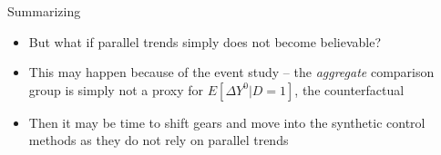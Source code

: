 \documentclass{beamer}
\begin{document}
\begin{frame}{Summarizing}

\begin{itemize}

\item But what if parallel trends simply does not become believable?
\item This may happen because of the event study -- the \emph{aggregate} comparison group is simply not a proxy for $E[\Delta Y^0|D=1]$, the counterfactual
\item Then it may be time to shift gears and move into the synthetic control methods as they do not rely on parallel trends

\end{itemize}

\end{frame}
\end{document}

